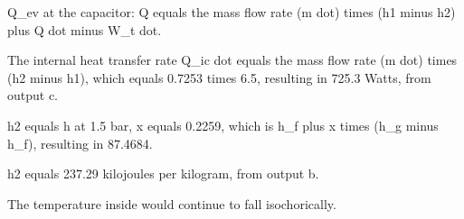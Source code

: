 Q_ev at the capacitor:
Q equals the mass flow rate (m dot) times (h1 minus h2) plus Q dot minus W_t dot.

The internal heat transfer rate Q_ic dot equals the mass flow rate (m dot) times (h2 minus h1), which equals 0.7253 times 6.5, resulting in 725.3 Watts, from output c.

h2 equals h at 1.5 bar, x equals 0.2259, which is h_f plus x times (h_g minus h_f), resulting in 87.4684.

h2 equals 237.29 kilojoules per kilogram, from output b.

The temperature inside would continue to fall isochorically.